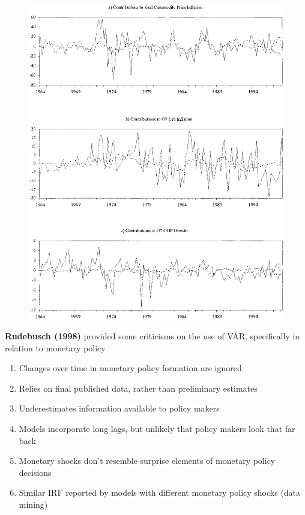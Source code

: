 \documentclass{beamer}
\begin{document}
\begin{frame}
  \begin{figure}
    \includegraphics[scale=.3]{brunner5.eps}
  \end{figure}
\end{frame}

\begin{frame}
  \textbf{Rudebusch (1998)} provided some criticisms on the use of VAR, specifically in relation to monetary policy
  \medskip
  \begin{enumerate}
    \item Changes over time in monetary policy formation are ignored
    \item Relies on final published data, rather than preliminary estimates
    \item Underestimates information available to policy makers
    \item Models incorporate long lags, but unlikely that policy makers look that far back
    \item Monetary shocks don't resemble surprise elements of monetary policy decisions
    \item Similar IRF reported by models with different monetary policy shocks (data mining)
  \end{enumerate}
\end{frame}
\end{document}
